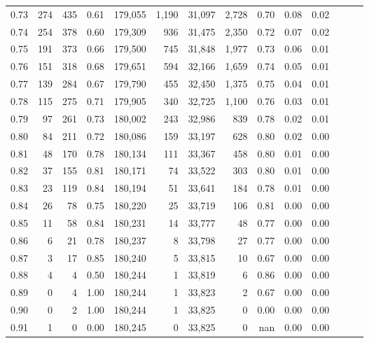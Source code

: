 \begin{tabular}{rrrrrrrrrrrrrr}
0.73 &    274 &  435 &  0.61 &  179,055 &    1,190 &  31,097 &   2,728 &  0.70 &  0.08 &      0.02 \\
0.74 &    254 &  378 &  0.60 &  179,309 &      936 &  31,475 &   2,350 &  0.72 &  0.07 &      0.02 \\
0.75 &    191 &  373 &  0.66 &  179,500 &      745 &  31,848 &   1,977 &  0.73 &  0.06 &      0.01 \\
0.76 &    151 &  318 &  0.68 &  179,651 &      594 &  32,166 &   1,659 &  0.74 &  0.05 &      0.01 \\
0.77 &    139 &  284 &  0.67 &  179,790 &      455 &  32,450 &   1,375 &  0.75 &  0.04 &      0.01 \\
0.78 &    115 &  275 &  0.71 &  179,905 &      340 &  32,725 &   1,100 &  0.76 &  0.03 &      0.01 \\
0.79 &     97 &  261 &  0.73 &  180,002 &      243 &  32,986 &     839 &  0.78 &  0.02 &      0.01 \\
0.80 &     84 &  211 &  0.72 &  180,086 &      159 &  33,197 &     628 &  0.80 &  0.02 &      0.00 \\
0.81 &     48 &  170 &  0.78 &  180,134 &      111 &  33,367 &     458 &  0.80 &  0.01 &      0.00 \\
0.82 &     37 &  155 &  0.81 &  180,171 &       74 &  33,522 &     303 &  0.80 &  0.01 &      0.00 \\
0.83 &     23 &  119 &  0.84 &  180,194 &       51 &  33,641 &     184 &  0.78 &  0.01 &      0.00 \\
0.84 &     26 &   78 &  0.75 &  180,220 &       25 &  33,719 &     106 &  0.81 &  0.00 &      0.00 \\
0.85 &     11 &   58 &  0.84 &  180,231 &       14 &  33,777 &      48 &  0.77 &  0.00 &      0.00 \\
0.86 &      6 &   21 &  0.78 &  180,237 &        8 &  33,798 &      27 &  0.77 &  0.00 &      0.00 \\
0.87 &      3 &   17 &  0.85 &  180,240 &        5 &  33,815 &      10 &  0.67 &  0.00 &      0.00 \\
0.88 &      4 &    4 &  0.50 &  180,244 &        1 &  33,819 &       6 &  0.86 &  0.00 &      0.00 \\
0.89 &      0 &    4 &  1.00 &  180,244 &        1 &  33,823 &       2 &  0.67 &  0.00 &      0.00 \\
0.90 &      0 &    2 &  1.00 &  180,244 &        1 &  33,825 &       0 &  0.00 &  0.00 &      0.00 \\
0.91 &      1 &    0 &  0.00 &  180,245 &        0 &  33,825 &       0 &   nan &  0.00 &      0.00 \\

\end{tabular}
